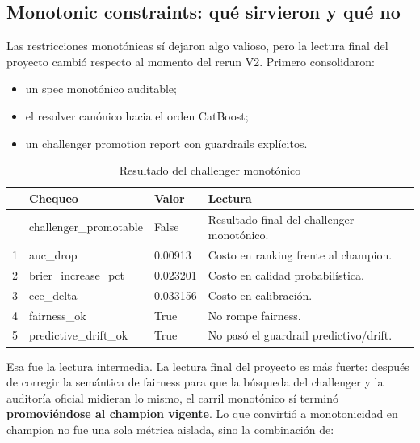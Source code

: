 \documentclass[
  spanish,
  11pt,
  letterpaper,
]{scrbook}
\providecommand{\tightlist}{%
  \setlength{\itemsep}{0pt}\setlength{\parskip}{0pt}}
\theoremstyle{plain}
\theoremstyle{remark}
\begin{document}
\subsection{Monotonic constraints: qué sirvieron y qué
no}\label{monotonic-constraints-quuxe9-sirvieron-y-quuxe9-no}

Las restricciones monotónicas sí dejaron algo valioso, pero la lectura
final del proyecto cambió respecto al momento del rerun V2. Primero
consolidaron:

\begin{itemize}
\tightlist
\item
  un spec monotónico auditable;
\item
  el resolver canónico hacia el orden CatBoost;
\item
  un challenger promotion report con guardrails explícitos.
\end{itemize}

{

\begin{longtable}[]{@{}llll@{}}

\caption{\label{tbl-rerun-v2-monotonic}Resultado del challenger
monotónico}

\tabularnewline

\toprule\noalign{}
& Chequeo & Valor & Lectura \\
\midrule\noalign{}
\endhead
\bottomrule\noalign{}
\endlastfoot
0 & challenger\_promotable & False & Resultado final del challenger
monotónico. \\
1 & auc\_drop & 0.00913 & Costo en ranking frente al champion. \\
2 & brier\_increase\_pct & 0.023201 & Costo en calidad
probabilística. \\
3 & ece\_delta & 0.033156 & Costo en calibración. \\
4 & fairness\_ok & True & No rompe fairness. \\
5 & predictive\_drift\_ok & True & No pasó el guardrail
predictivo/drift. \\

\end{longtable}

}

Esa fue la lectura intermedia. La lectura final del proyecto es más
fuerte: después de corregir la semántica de fairness para que la
búsqueda del challenger y la auditoría oficial midieran lo mismo, el
carril monotónico sí terminó \textbf{promoviéndose al champion vigente}.
Lo que convirtió a monotonicidad en champion no fue una sola métrica
aislada, sino la combinación de:
\end{document}
